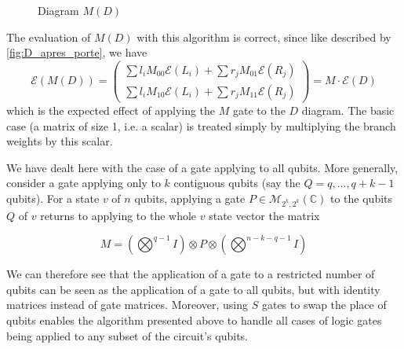 \begin{figure}[H]
  \centering
  \caption {Diagram $M(D)$}
  \label{fig:D_apres_porte}
\end{figure}

The evaluation of $M(D)$ with this algorithm is correct, since like described by \autoref{fig:D_apres_porte}, we have
$$\mathcal E(M(D)) = \begin{pmatrix}
  \sum l_i M_{00} \mathcal E (L_i) + \sum r_j M_{01} \mathcal E (R_j) \\
  \sum l_i M_{10} \mathcal E (L_i) + \sum r_j M_{11} \mathcal E (R_j)
\end{pmatrix} = M \cdot \mathcal E (D)$$
\noindent which is the expected effect of applying the $M$ gate to the $D$ diagram. The basic case (a matrix of size 1, i.e. a scalar) is treated simply by multiplying the branch weights by this scalar.

We have dealt here with the case of a gate applying to all qubits. More generally, consider a gate applying only to $k$ contiguous qubits (say the $Q ={q, ..., q+k-1}$ qubits). For a state $v$ of $n$ qubits, applying a gate $P \in \mathcal M_{2^k, 2^k}(\mathbb C)$ to the qubits $Q$ of $v$ returns to applying to the whole $v$ state vector the matrix

$$M = \left(\bigotimes^{q-1} I\right) \otimes P \otimes \left(\bigotimes^{n-k-q-1} I\right)$$

We can therefore see that the application of a gate to a restricted number of qubits can be seen as the application of a gate to all qubits, but with identity matrices instead of gate matrices.
Moreover, using $S$ gates to swap the place of qubits enables the algorithm presented above to handle all cases of logic gates being applied to any subset of the circuit's qubits.
